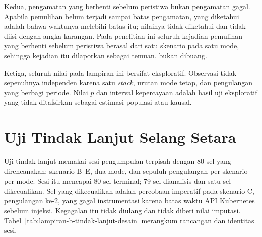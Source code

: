 Kedua, pengamatan yang berhenti sebelum peristiwa bukan pengamatan gagal. Apabila pemulihan belum terjadi sampai batas pengamatan, yang diketahui adalah bahwa waktunya melebihi batas itu; nilainya tidak diketahui dan tidak diisi dengan angka karangan. Pada penelitian ini seluruh kejadian pemulihan yang berhenti sebelum peristiwa berasal dari satu skenario pada satu mode, sehingga kejadian itu dilaporkan sebagai temuan, bukan dibuang.

Ketiga, seluruh nilai pada lampiran ini bersifat eksploratif. Observasi tidak sepenuhnya independen karena satu \textit{stack}, urutan mode tetap, dan pengulangan yang berbagi periode. Nilai $p$ dan interval kepercayaan adalah hasil uji eksploratif yang tidak ditafsirkan sebagai estimasi populasi atau kausal.

\section{Uji Tindak Lanjut Selang Setara}
\label{sec:tindak-lanjut-lampiran}

Uji tindak lanjut memakai sesi pengumpulan terpisah dengan 80 sel yang direncanakan: skenario B--E, dua mode, dan sepuluh pengulangan per skenario per mode. Sesi itu mencapai 80 sel terminal; 79 sel dianalisis dan satu sel dikecualikan. Sel yang dikecualikan adalah percobaan imperatif pada skenario C, pengulangan ke-2, yang gagal instrumentasi karena batas waktu API Kubernetes sebelum injeksi. Kegagalan itu tidak diulang dan tidak diberi nilai imputasi. Tabel~\ref{tab:lampiran-b-tindak-lanjut-desain} merangkum rancangan dan identitas sesi.

